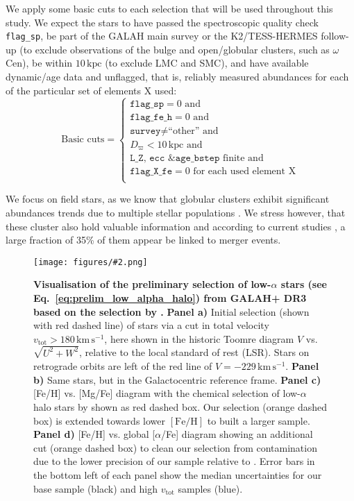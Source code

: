 \documentclass[fleqn,usenatbib]{mnras}
\newcommand{\kpc}{\,\mathrm{kpc}}	%
\newcommand{\kms}{\,\mathrm{km\,s^{-1}}}	%
\newcommand{\codeicon}{{\faCloudDownload}}
\newcommand{\codelink}[1]{\href{https://github.com/svenbuder/buder_galah_accreted_chemistry/tree/main/figures/#1.ipynb}{\codeicon}\,\,}
\newcommand{\oscaption}[2]{\caption{#2 \codelink{#1}}}
\newcommand{\figuretextwidth}[4]{\begin{figure*} \centering \texttt{[image: figures/\#2.png]}\oscaption{#3}{#4}\label{fig:#2} \end{figure*}}
\begin{document}
We apply some basic cuts to each selection that will be used throughout this study. We expect the stars to have passed the spectroscopic quality check \texttt{flag\_sp}, be part of the GALAH main survey or the K2/TESS-HERMES follow-up (to exclude observations of the bulge and open/globular clusters, such as $\omega$\,Cen), be within $10 \kpc$ (to exclude LMC and SMC), and have available dynamic/age data and unflagged, that is, reliably measured abundances for each of the particular set of elements X used:\begin{equation} \label{eq:basic_cuts}
\text{Basic cuts} = 
\begin{cases}
\texttt{flag\_sp} = 0 \text{ and} \\
\texttt{flag\_fe\_h} = 0 \text{ and} \\
\texttt{survey} \neq \text{``other'' and} \\
D_\varpi < 10\kpc \text{ and} \\
\texttt{L\_Z}\text{, }\texttt{ecc}\text{ \& }\texttt{age\_bstep} \text{ finite and} \\
\texttt{flag\_X\_fe} = 0 \text{ for each used element X} \\
\end{cases}
\end{equation}

We focus on field stars, as we know that globular clusters exhibit significant abundances trends due to multiple stellar populations \citep[e.g.][]{Carretta2009}. We stress however, that these cluster also hold valuable information and according to current studies \citep[e.g.][]{Massari2019, KochHansen2021}, a large fraction of 35\% of them appear be linked to merger events.

\figuretextwidth{17cm}{nissen_selection_corner}{chemical_differences}{
\textbf{Visualisation of the preliminary selection of low-$\alpha$ stars (see Eq.~\ref{eq:prelim_low_alpha_halo}) from GALAH+ DR3 based on the selection by \citet{Nissen2010}.}
\textbf{Panel a)} Initial selection (shown with red dashed line) of stars via a cut in total velocity $v_\text{tot} > 180\,\mathrm{km\,s^{-1}}$, here shown in the historic Toomre diagram $V$ vs. $\sqrt{U^2 + W^2}$, relative to the local standard of rest (LSR). Stars on retrograde orbits are left of the red line of $V = -229\kms$.
\textbf{Panel b)} Same stars, but in the Galactocentric reference frame.
\textbf{Panel c)} [Fe/H] vs. [Mg/Fe] diagram with the chemical selection of low-$\alpha$ halo stars by \citet{Nissen2010} shown as red dashed box. Our selection (orange dashed box) is extended towards lower $\mathrm{[Fe/H]}$ to built a larger sample.
\textbf{Panel d)} [Fe/H] vs. global [$\alpha$/Fe] diagram showing an additional cut (orange dashed box) to clean our selection from contamination due to the lower precision of our sample relative to \citet{Nissen2010}.
Error bars in the bottom left of each panel show the median uncertainties for our base sample (black) and high $v_\text{tot}$ samples (blue).
}
\end{document}
